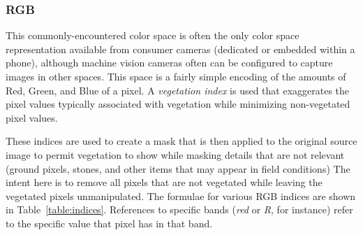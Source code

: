 \documentclass[agriculture,article,submit,pdftex,moreauthors]{Definitions/mdpi}
\begin{document}
\subsubsection{RGB}
This commonly-encountered color space is often the only color space representation available from consumer cameras (dedicated or embedded within a phone), although machine vision cameras often can be configured to capture images in other spaces. This space is a fairly simple encoding of the amounts of Red, Green, and Blue of a pixel. A \textit{vegetation index} is used that exaggerates the pixel values typically associated with vegetation while minimizing non-vegetated pixel values.

These indices are used to create a mask that is then applied to the original source image to permit vegetation to show while masking details that are not relevant (ground pixels, stones, and other items that may appear in field conditions) The intent here is to remove all pixels that are not vegetated while leaving the vegetated pixels unmanipulated. The formulae for various RGB indices are shown in Table~\ref{table:indices}. References to specific bands (\textit{red} or \textit{R}, for instance) refer to the specific value that pixel has in that band.
\end{document}
